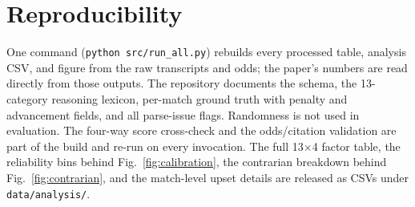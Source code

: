 \documentclass[sigconf,nonacm]{acmart}
\begin{document}



\appendix
\section{Reproducibility}
One command (\texttt{python src/run\_all.py}) rebuilds every processed table,
analysis CSV, and figure from the raw transcripts and odds; the paper's numbers
are read directly from those outputs. The repository documents the schema,
the 13-category reasoning lexicon, per-match ground truth with penalty and
advancement fields, and all parse-issue flags. Randomness is not used in
evaluation. The four-way score cross-check and the odds/citation validation are
part of the build and re-run on every invocation. The full 13$\times$4 factor
table, the reliability bins behind Fig.~\ref{fig:calibration}, the contrarian
breakdown behind Fig.~\ref{fig:contrarian}, and the match-level upset details are
released as CSVs under \texttt{data/analysis/}.
\end{document}

